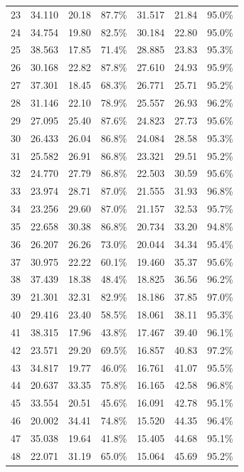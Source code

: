 \begin{longtable}{rrrrrrr}
    23 & 34.110 & 20.18 & 87.7\% & 31.517 & 21.84 & 95.0\% \\
    24 & 34.754 & 19.80 & 82.5\% & 30.184 & 22.80 & 95.0\% \\
    25 & 38.563 & 17.85 & 71.4\% & 28.885 & 23.83 & 95.3\% \\
    26 & 30.168 & 22.82 & 87.8\% & 27.610 & 24.93 & 95.9\% \\
    27 & 37.301 & 18.45 & 68.3\% & 26.771 & 25.71 & 95.2\% \\
    28 & 31.146 & 22.10 & 78.9\% & 25.557 & 26.93 & 96.2\% \\
    29 & 27.095 & 25.40 & 87.6\% & 24.823 & 27.73 & 95.6\% \\
    30 & 26.433 & 26.04 & 86.8\% & 24.084 & 28.58 & 95.3\% \\
    31 & 25.582 & 26.91 & 86.8\% & 23.321 & 29.51 & 95.2\% \\
    32 & 24.770 & 27.79 & 86.8\% & 22.503 & 30.59 & 95.6\% \\
    33 & 23.974 & 28.71 & 87.0\% & 21.555 & 31.93 & 96.8\% \\
    34 & 23.256 & 29.60 & 87.0\% & 21.157 & 32.53 & 95.7\% \\
    35 & 22.658 & 30.38 & 86.8\% & 20.734 & 33.20 & 94.8\% \\
    36 & 26.207 & 26.26 & 73.0\% & 20.044 & 34.34 & 95.4\% \\
    37 & 30.975 & 22.22 & 60.1\% & 19.460 & 35.37 & 95.6\% \\
    38 & 37.439 & 18.38 & 48.4\% & 18.825 & 36.56 & 96.2\% \\
    39 & 21.301 & 32.31 & 82.9\% & 18.186 & 37.85 & 97.0\% \\
    40 & 29.416 & 23.40 & 58.5\% & 18.061 & 38.11 & 95.3\% \\
    41 & 38.315 & 17.96 & 43.8\% & 17.467 & 39.40 & 96.1\% \\
    42 & 23.571 & 29.20 & 69.5\% & 16.857 & 40.83 & 97.2\% \\
    43 & 34.817 & 19.77 & 46.0\% & 16.761 & 41.07 & 95.5\% \\
    44 & 20.637 & 33.35 & 75.8\% & 16.165 & 42.58 & 96.8\% \\
    45 & 33.554 & 20.51 & 45.6\% & 16.091 & 42.78 & 95.1\% \\
    46 & 20.002 & 34.41 & 74.8\% & 15.520 & 44.35 & 96.4\% \\
    47 & 35.038 & 19.64 & 41.8\% & 15.405 & 44.68 & 95.1\% \\
    48 & 22.071 & 31.19 & 65.0\% & 15.064 & 45.69 & 95.2\% \\

\end{longtable}
